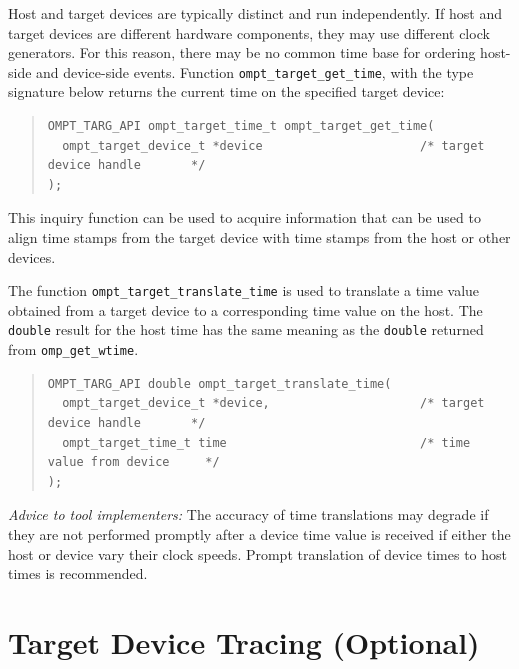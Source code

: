 \documentclass{article}
\begin{document}
Host and target devices are typically distinct and run independently. If 
host and target devices are different hardware components, they may 
use different clock generators. For this reason,  there may be no common time base for ordering host-side and device-side events.
Function \verb|ompt_target_get_time|, with the type signature below returns the current time on the specified target device:
\begin{quote}
\begin{verbatim}
OMPT_TARG_API ompt_target_time_t ompt_target_get_time(
  ompt_target_device_t *device                      /* target device handle       */
);
\end{verbatim}
\end{quote}
This inquiry function can be used
to acquire information that can be used to align time stamps from the target device with time
stamps from the host or other devices.

The function \verb|ompt_target_translate_time| is used to translate a time value obtained from a target device to a corresponding time value on the host. The {\tt double} result for the host time has the same meaning as the {\tt double} returned from \verb|omp_get_wtime|.
\begin{quote}
\begin{verbatim}
OMPT_TARG_API double ompt_target_translate_time(
  ompt_target_device_t *device,                     /* target device handle       */
  ompt_target_time_t time                           /* time value from device     */
);
\end{verbatim}
\end{quote}
\noindent
{\em Advice to tool implementers:} The accuracy of time translations may degrade if they are not performed promptly after a device time value is received if either the host or device vary their clock speeds. Prompt translation of device times to host times is recommended.

\section{Target Device Tracing (Optional)}
\label{sec:target-device-records}
\end{document}
